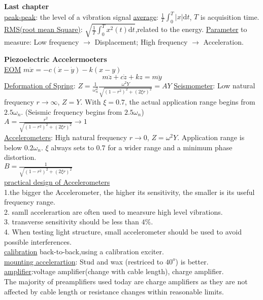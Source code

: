 \documentclass{article}
\begin{document}
\begin{multicols*}{3}
  \noindent\textbf{Last chapter}\\
  \underline{peak-peak}: the level of a vibration signal
  \underline{average}: $\frac{1}{T}\int_{0}^{T}|x|\text{d}t$, $T$ is acquisition time.
  \underline{RMS(root mean Square)}: $\sqrt{\frac{1}{T}\int_{0}^{T}x^{2}(t)\text{d}t}$,related  to the energy.
  \underline{Parameter} to measure: Low frequency $\rightarrow$ Displacement; High frequency $\rightarrow$ Acceleration.

\noindent\textbf{Piezoelectric Accelermoeters}\\
\underline{EOM} $m \ddot{x} = -c(\dot{x}-\dot{y}) - k(x-y)$
\begin{equation*}
  m\ddot{z}+c\dot{z}+kz=m\ddot{y}
\end{equation*}
  \underline{Deformation of Spring}: $Z = \frac{1}{\omega_n^2} \frac{\omega^2Y}{\sqrt{(1-r^2)^2+(2\xi r)^2}} = A Y$
  \underline{Seismometer}: Low natural frequency $r\rightarrow\infty$, $Z = Y$. With $\xi=0.7$, the actual application range begins from $2.5\omega_n$. (Seismic frequency begins from $2.5\omega_n$)\\
  $A=\frac{r^{2}}{\sqrt{(1-r^{2})^{2}+(2\xi r)^{2}}}\rightarrow 1$\\
  \underline{Accelerometers}: High natural frequency $r\rightarrow0$, $Z = \omega^2Y$. Application range is below $0.2\omega_n$. $\xi$ always sets to $0.7$ for a wider range and a minimum phase distortion.\\
  $B=\frac{1}{\sqrt{(1-r^{2})^{2}+(2\xi r)^{2}}}$\\
\underline{practical design of Accelerometers}\\
1.the bigger the Accelerometer, the higher its sensitivity, the smaller is its useful frequency range.\\
2. samll accelerartion are often used to mearsure high level vibrations.\\
3. transverse sensitivity should be less than $4\%$.\\
4. When testing light structure, small accelerometer should be used to avoid possible interferences.\\
\underline{calibration} back-to-back,using a calibration exciter.\\
\underline{mounting accelerartion}: Stud and wax (restriced to $40^{o}$) is better.\\
\underline{amplifier}:voltage amplifier(change with cable length), charge amplifier.\\
The majority of preamplifiers used today are charge amplifiers as they are not affected by cable length or resistance changes within reasonable limits.\\


\end{multicols*}
\end{document}
